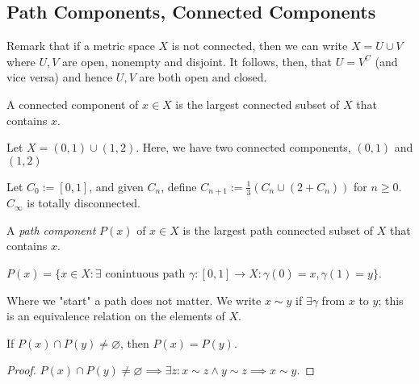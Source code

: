 \subsection{Path Components, Connected Components}
\begin{remark}
    Remark that if a metric space $X$ is not connected, then we can write $X = U \cup V$ where $U, V$ are open, nonempty and disjoint. It follows, then, that $U = V^C$ (and vice versa) and hence $U,V$ are both open and closed.
\end{remark}

\begin{definition}
    A connected component of $x \in X$ is the largest connected subset of $X$ that contains $x$.
\end{definition}

\begin{example}
    Let $X = (0, 1) \cup (1, 2)$. Here, we have two connected components, $(0,1)$ and $(1, 2)$
\end{example}

\begin{example}
    Let $C_0 := [0, 1]$, and given $C_n$, define $C_{n+1} := \frac{1}{3}\left(C_{n} \cup (2 +C_{n})\right)$ for $n \geq 0$. $C_\infty$ is totally disconnected.
\end{example}

\begin{definition}
    A \emph{path component} $P(x)$ of $x \in X$ is the largest path connected subset of $X$ that contains $x$.
\end{definition}

\begin{proposition}
    $P(x) = \{x \in X : \exists \text{ conintuous path } \gamma: [0, 1] \to X : \gamma(0) = x, \gamma (1) = y\}$.
\end{proposition}

\begin{remark}
    Where we "start" a path does not matter. We write $x \sim y$ if $\exists \gamma$ from $x$ to $y$; this is an equivalence relation on the elements of $X$.
\end{remark}

\begin{lemma}
    If $P(x) \cap P(y) \neq \varnothing$, then $P(x) = P(y)$.
\end{lemma}

\begin{proof}
    $P(x) \cap P(y) \neq \varnothing \implies \exists z : x \sim z \wedge y \sim z \implies x \sim y$.
\end{proof}

